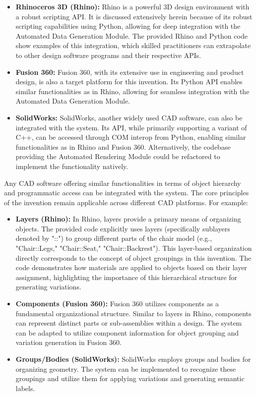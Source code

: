 \documentclass{article}
\begin{document}
\begin{itemize}
    \item \textbf{Rhinoceros 3D (Rhino):} Rhino is a powerful 3D design environment with a robust scripting API. It is discussed extensively herein because of its robust scripting capabilities using Python, allowing for deep integration with the Automated Data Generation Module. The provided Rhino and Python code show examples of this integration, which skilled practitioners can extrapolate to other design software programs and their respective APIs. 
    \item \textbf{Fusion 360:} Fusion 360, with its extensive use in engineering and product design, is also a target platform for this invention. Its Python API enables similar functionalities as in Rhino, allowing for seamless integration with the Automated Data Generation Module.
    \item \textbf{SolidWorks:} SolidWorks, another widely used CAD software, can also be integrated with the system. Its API, while primarily supporting a variant of C++, can be accessed through COM interop from Python, enabling similar functionalities as in Rhino and Fusion 360. Alternatively, the codebase providing the Automated Rendering Module could be refactored to implement the functionality natively.
\end{itemize}

Any CAD software offering similar functionalities in terms of object hierarchy and programmatic access can be integrated with the system. The core principles of the invention remain applicable across different CAD platforms. For example:


\begin{itemize}
    \item \textbf{Layers (Rhino):} In Rhino, layers provide a primary means of organizing objects. The provided code explicitly uses layers (specifically sublayers denoted by "::") to group different parts of the chair model (e.g., "Chair::Legs," "Chair::Seat," "Chair::Backrest"). This layer-based organization directly corresponds to the concept of object groupings in this invention. The code demonstrates how materials are applied to objects based on their layer assignment, highlighting the importance of this hierarchical structure for generating variations.
    \item \textbf{Components (Fusion 360):} Fusion 360 utilizes components as a fundamental organizational structure. Similar to layers in Rhino, components can represent distinct parts or sub-assemblies within a design. The system can be adapted to utilize component information for object grouping and variation generation in Fusion 360.
    \item \textbf{Groups/Bodies (SolidWorks):} SolidWorks employs groups and bodies for organizing geometry. The system can be implemented to recognize these groupings and utilize them for applying variations and generating semantic labels.
\end{itemize}
\end{document}
